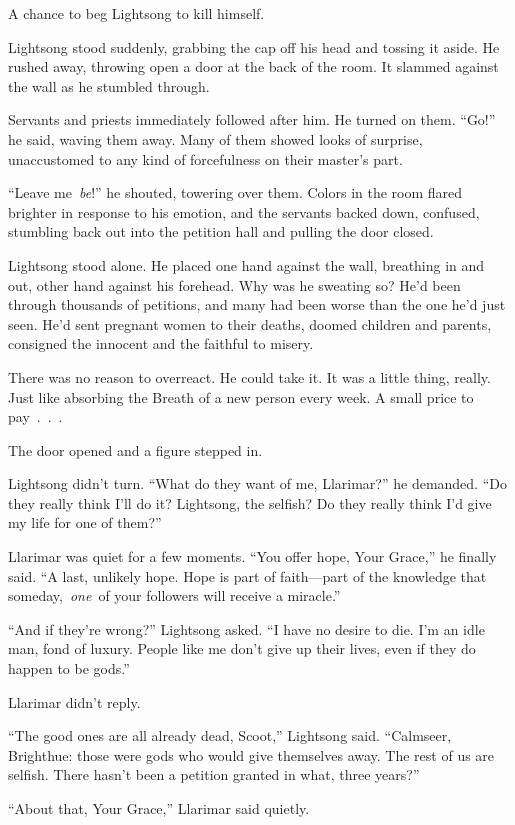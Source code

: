 A chance to beg Lightsong to kill himself.

Lightsong stood suddenly, grabbing the cap off his head and tossing it aside. He rushed away, throwing open a door at the back of the room. It slammed against the wall as he stumbled through.

Servants and priests immediately followed after him. He turned on them. “Go!” he said, waving them away. Many of them showed looks of surprise, unaccustomed to any kind of forcefulness on their master’s part.

“Leave me~\textit{be}!” he shouted, towering over them. Colors in the room flared brighter in response to his emotion, and the servants backed down, confused, stumbling back out into the petition hall and pulling the door closed.

Lightsong stood alone. He placed one hand against the wall, breathing in and out, other hand against his forehead. Why was he sweating so? He’d been through thousands of petitions, and many had been worse than the one he’d just seen. He’d sent pregnant women to their deaths, doomed children and parents, consigned the innocent and the faithful to misery.

There was no reason to overreact. He could take it. It was a little thing, really. Just like absorbing the Breath of a new person every week. A small price to pay~.~.~.

The door opened and a figure stepped in.

Lightsong didn’t turn. “What do they want of me, Llarimar?” he demanded. “Do they really think I’ll do it? Lightsong, the selfish? Do they really think I’d give my life for one of them?”

Llarimar was quiet for a few moments. “You offer hope, Your Grace,” he finally said. “A last, unlikely hope. Hope is part of faith—part of the knowledge that someday,~\textit{one}~of your followers will receive a miracle.”

“And if they’re wrong?” Lightsong asked. “I have no desire to die. I’m an idle man, fond of luxury. People like me don’t give up their lives, even if they do happen to be gods.”

Llarimar didn’t reply.

“The good ones are all already dead, Scoot,” Lightsong said. “Calmseer, Brighthue: those were gods who would give themselves away. The rest of us are selfish. There hasn’t been a petition granted in what, three years?”

“About that, Your Grace,” Llarimar said quietly.

